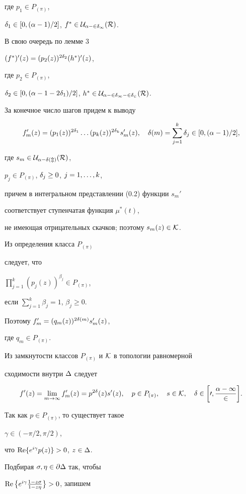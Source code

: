 \begin{pf}
где $p_1\in P_{(\pi)}$,


$\delta_1\in[0,(\alpha-1)/2]$, $f^*\in\cal U_{\alpha-2\delta_1}(R)$.


В свою очередь по лемме 3\; 


$(f^*)'(z)=(p_2(z))^{2\delta_2}(h^*)'(z)$,


где $p_2\in P_{(\pi)}$,


$\delta_2\in[0,(\alpha-1-2\delta_1)/2]$, $h^*\in\cal U_{\alpha-2\delta_1-2\delta_2}(R)$.


За конечное число шагов придем к выводу


$$


f'_m(z)=(p_1(z))^{2\de_1}\ld(p_k(z))^{2\de_k}s'_m(z), \quad


\de(m)=\sum_{j=1}^k\de_j\in[0,(\al-1)/2],


$$


где $s_m\in\cal U_{\alpha-\delta(m)}(R)$, 


$p_j\in P_{(\pi)}$, $\delta_j\ge 0$, $j=1,\dotsc,k$,


причем в интегральном представлении (0.2) функции $s_m'$


соответствует ступенчатая функция $\mu^*(t)$,


не имеющая отрицательных скачков; поэтому $s_m(z)\in\cal K$.


Из определения класса $P_{(\pi)}$


следует, что


$\prod\limits_{j=1}^k(p_j(z))^{\beta_j}\in P_{(\pi)}$,


если $\sum\limits_{j=1}^k\beta_j=1$, $\beta_j\ge 0$.


Поэтому $f'_m=(q_m(z))^{2\delta(m)}s_m'(z)$,


где $q_m\in P_{(\pi)}$.


Из замкнутости классов $P_{(\pi)}$ и $\cal K$ в топологии равномерной


сходимости внутри $\Delta$ следует


$$


f'(z)=\lim_{m\to\infty} f'_m(z)=p^{2\de}(z)s'(z), \quad p\in


P_{(\pi)}, \quad s\in\CK, \quad \de\in\bigg[0,\frac{\al-1}{2}\bigg].


$$


Так как $p\in P_{(\pi)}$, то существует такое


$\gamma\in(-\pi/2,\pi/2)$,


что $\operatorname{Re}\{e^{i\gamma} p(z)\}>0$, $z\in\Delta$.


Подбирая $\sigma, \eta\in\partial\Delta$ так, чтобы


$\operatorname{Re}\big\{e^{i\gamma}\frac{1-z\sigma}{1-z\eta}\big\}>0$, запишем



\end{pf}
